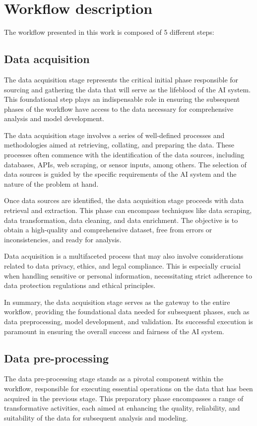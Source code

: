 \documentclass[12pt,a4paper,openright,twoside]{book}
\begin{document}
\section{Workflow description}
The workflow presented in this work is composed of 5 different steps:

\subsection{Data acquisition}
The data acquisition stage represents the critical initial phase responsible for sourcing and gathering the data that will serve as the lifeblood of the AI system. This foundational step plays an indispensable role in ensuring the subsequent phases of the workflow have access to the data necessary for comprehensive analysis and model development. 

The data acquisition stage involves a series of well-defined processes and methodologies aimed at retrieving, collating, and preparing the data. These processes often commence with the identification of the data sources, including databases, APIs, web scraping, or sensor inputs, among others. The selection of data sources is guided by the specific requirements of the AI system and the nature of the problem at hand. 

Once data sources are identified, the data acquisition stage proceeds with data retrieval and extraction. This phase can encompass techniques like data scraping, data transformation, data cleaning, and data enrichment. The objective is to obtain a high-quality and comprehensive dataset, free from errors or inconsistencies, and ready for analysis. 

Data acquisition is a multifaceted process that may also involve considerations related to data privacy, ethics, and legal compliance. This is especially crucial when handling sensitive or personal information, necessitating strict adherence to data protection regulations and ethical principles. 

In summary, the data acquisition stage serves as the gateway to the entire workflow, providing the foundational data needed for subsequent phases, such as data preprocessing, model development, and validation. Its successful execution is paramount in ensuring the overall success and fairness of the AI system.

\subsection{Data pre-processing}
The data pre-processing stage stands as a pivotal component within the workflow, responsible for executing essential operations on the data that has been acquired in the previous stage. This preparatory phase encompasses a range of transformative activities, each aimed at enhancing the quality, reliability, and suitability of the data for subsequent analysis and modeling. 
\end{document}
